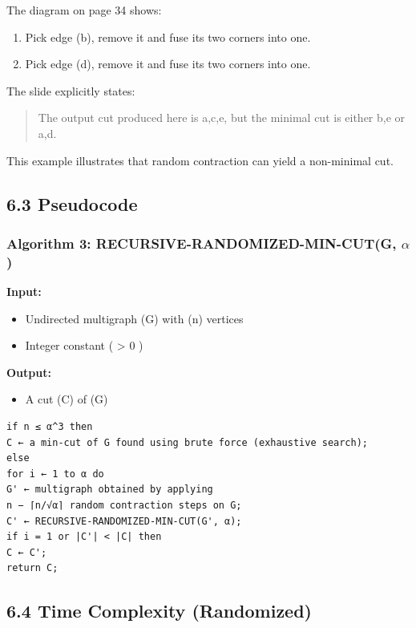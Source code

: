 \documentclass[12pt]{article}
\begin{document}
The diagram on page 34 shows:

\begin{enumerate}
\item Pick edge (b), remove it and fuse its two corners into one.
\item Pick edge (d), remove it and fuse its two corners into one.
\end{enumerate}

The slide explicitly states:

\begin{quote}
The output cut produced here is {a,c,e}, but the minimal cut is either {b,e} or {a,d}.
\end{quote}

This example illustrates that random contraction can yield a non-minimal cut.

\bigskip

\subsection*{6.3 Pseudocode}

\subsubsection*{Algorithm 3: RECURSIVE-RANDOMIZED-MIN-CUT(G, $\alpha$)}

\textbf{Input:}

\begin{itemize}
\item Undirected multigraph (G) with (n) vertices
\item Integer constant ( \alpha > 0 )
\end{itemize}

\textbf{Output:}

\begin{itemize}
\item A cut (C) of (G)
\end{itemize}

\begin{verbatim}
if n ≤ α^3 then
C ← a min-cut of G found using brute force (exhaustive search);
else
for i ← 1 to α do
G' ← multigraph obtained by applying
n − ⌈n/√α⌉ random contraction steps on G;
C' ← RECURSIVE-RANDOMIZED-MIN-CUT(G', α);
if i = 1 or |C'| < |C| then
C ← C';
return C;
\end{verbatim}

\bigskip

\subsection*{6.4 Time Complexity (Randomized)}
\end{document}
